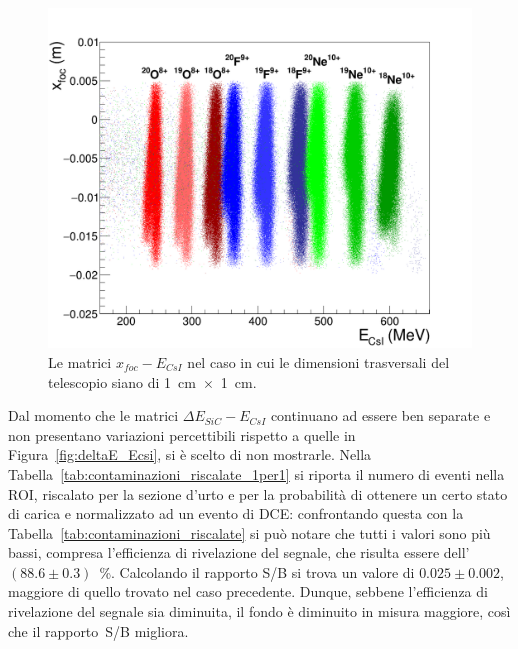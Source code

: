 \begin{figure} [!p]
	\centering
	\includegraphics[width=\textwidth, keepaspectratio]{Grafici_Tesi2/1per1/xf_ecsi_quadrata.png}
	\caption{Le matrici $x_{foc} - E_{CsI}$ nel caso in cui le dimensioni trasversali del telescopio siano di 1~cm~$\times$~1~cm.} \label{fig:xf_ecsi_1per1}
\end{figure} 


Dal momento che le matrici $\Delta E_{SiC} - E_{CsI}$ continuano ad essere ben separate e non presentano variazioni percettibili rispetto a quelle in Figura~\ref{fig:deltaE_Ecsi}, si è scelto di non mostrarle.
Nella Tabella~\ref{tab:contaminazioni_riscalate_1per1} si riporta il numero di eventi nella ROI, riscalato per la sezione d'urto e per la probabilità di ottenere un certo stato di carica e normalizzato ad un evento di DCE: confrontando questa con la Tabella~\ref{tab:contaminazioni_riscalate} si può notare che tutti i valori sono più bassi, compresa l'efficienza di rivelazione del segnale, che risulta essere dell'$(88.6 \pm 0.3)$~\%.
Calcolando il rapporto S/B si trova un valore di $0.025 \pm 0.002$, maggiore di quello trovato nel caso precedente.
Dunque, sebbene l'efficienza di rivelazione del segnale sia diminuita, il fondo è diminuito in misura maggiore, così che il rapporto~S/B migliora.



